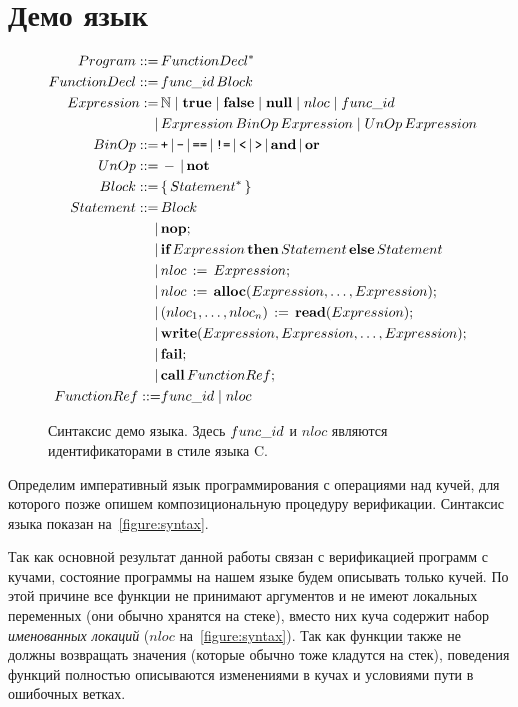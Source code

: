 \section{Демо язык}
\label{sec:language}

\begin{figure}
\begin{align*}
Program ::=\,&FunctionDecl^* \cr
FunctionDecl ::=\,&func\_id\,Block \cr
Expression :=\,&\mathbb{N} \mid \textbf{true} \mid \textbf{false} \mid \textbf{null} \mid nloc \mid func\_id \cr
				\mid\,&Expression\,BinOp\,Expression \mid UnOp\,Expression\, \cr
BinOp ::=\,&\texttt{+}\,|\,\texttt{-}\,|\,\texttt{==}\,|\,\texttt{!=}\,|\,\texttt{<}\,|\,\texttt{>}\,|\,\textbf{and}{}\,|\,\textbf{or}{} \cr
UnOp ::=\,&-\,|\,\textbf{not}{} \cr
Block ::=\,&\{\,Statement^*\,\} \cr
Statement ::=\,&Block \cr
				\mid\,&\textbf{nop}{};\cr
				\mid\,&\textbf{if}\,Expression\,\textbf{then}\,Statement\,\textbf{else}\,Statement \cr
				\mid\,&nloc\,:=\,Expression; \cr
				\mid\,&nloc\,:=\,\textbf{alloc}{}(Expression,\ldots,Expression); \cr
				\mid\,&(nloc_1,\ldots,nloc_n)\,:=\,\textbf{read}{(Expression)}; \cr
				\mid\,&\textbf{write}{}(Expression, Expression, \ldots, Expression); \cr
				\mid\,&\textbf{fail}{}; \cr
				\mid\,&\textbf{call}{}\,FunctionRef; \cr
FunctionRef ::= &func\_id \mid nloc
\end{align*}
\caption{Синтаксис демо языка. Здесь $func\_id$ и $nloc$ являются идентификаторами в стиле языка C.}
\label{figure:syntax}
\end{figure}

Определим  императивный язык программирования с операциями над кучей, для которого позже опишем композициональную процедуру верификации. Синтаксис языка показан на~\autoref{figure:syntax}.

Так как основной результат данной работы связан с верификацией программ с кучами, состояние программы на нашем языке будем описывать только кучей. По этой причине все функции не принимают аргументов и не имеют локальных переменных (они обычно хранятся на стеке), вместо них куча содержит набор \emph{именованных локаций} ($nloc$ на~\autoref{figure:syntax}). Так как функции также не должны возвращать значения (которые обычно тоже кладутся на стек), поведения функций полностью описываются изменениями в кучах и условиями пути в ошибочных ветках.

